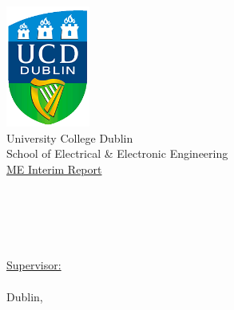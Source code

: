 
\begin{titlepage}
\begin{center}
\includegraphics[height=4cm]{Figures/ucd_logo.png} \\
\LARGE
University College Dublin \\
\Large
School of Electrical \& Electronic Engineering \\
\large
\underline{ME Interim Report}



\huge
\textbf{\doctitle \\}
\begin{singlespacing}
    \Large
    \authorone \\
    \sauthorone \\
\end{singlespacing}
\vfill
\large
\underline{Supervisor:} \\
\firstCommitteeMember \\



\large
Dublin, \monthYear \\

\end{center}
\end{titlepage} 
\clearpage
